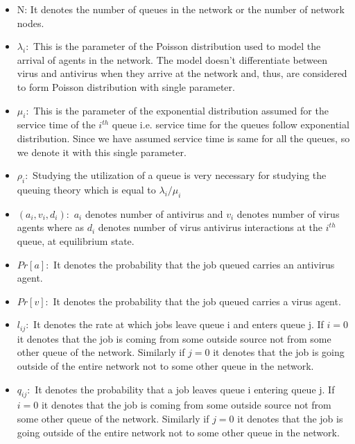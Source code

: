 \begin{itemize}
\item N: It denotes the number of queues in the network or the number of network nodes.

\item $\lambda_i: $ This is the parameter of the Poisson distribution used to model the arrival of agents in the network. The model doesn't differentiate between virus and antivirus when they arrive at the network and, thus, are considered to form Poisson distribution with single parameter.

\item $\mu_i: $ This is the parameter of the exponential distribution assumed for the service time of the $i^{th}$ queue i.e. service time for the queues follow exponential distribution. Since we have assumed service time is same for all the queues, so we denote it with this single parameter.

\item $\rho_i: $ Studying the utilization of a queue is very necessary for studying the queuing theory which is equal to  $ {\lambda_i}/{\mu_i} $

\item $(a_i, v_i, d_i): $ $a_i$ denotes number of antivirus and $v_i$ denotes number of virus agents where as $d_i$ denotes number of virus antivirus interactions at the $i^{th}$ queue, at equilibrium state.

\item $Pr[a]: $ It denotes the probability that the job queued carries an antivirus agent. 

\item $Pr[v]: $ It denotes the probability that the job queued carries a virus agent.

\item $l_{ij}: $ It denotes  the rate at which jobs leave queue i and enters queue j. If $i=0$ it denotes that the job is coming from some outside source not from some other queue of the network. Similarly if $j=0$ it denotes that the job is going outside of the entire network not to some other queue in the network.

\item $q_{ij}: $ It denotes the probability that a job leaves queue i entering queue j. If $i=0$ it denotes that the job is coming from some outside source not from some other queue of the network. Similarly if $j=0$ it denotes that the job is going outside of the entire network not to some other queue in the network.


\end{itemize}
